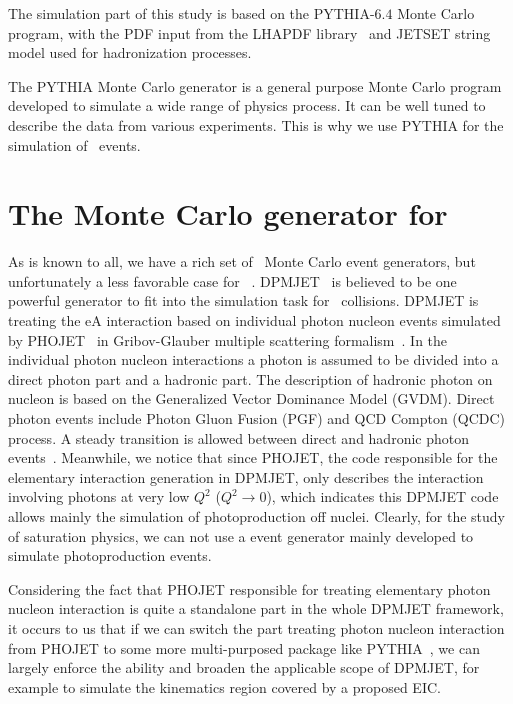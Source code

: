The simulation part of this study is based on the PYTHIA-$6.4$ Monte Carlo program,
with the PDF input from the LHAPDF library~\cite{Whalley:2005nh} and JETSET string model used for
hadronization processes. 


The PYTHIA Monte Carlo generator is a general purpose Monte Carlo program developed to simulate a wide range of physics process. It can be well tuned to describe the data from various experiments. This is why we use PYTHIA for the simulation of \ep\ events.


\section{The Monte Carlo generator for \eA\ }

As is known to all, we have a rich set of \ep\ Monte Carlo event generators, but
unfortunately a less favorable case for \eA~\cite{Boer:2011fh}.
DPMJET~\cite{Roesler:2000he} is believed to be one powerful generator to fit
into the simulation task for \eA\ collisions. DPMJET is treating the eA
interaction based on individual photon nucleon events simulated by
PHOJET~\cite{Engel:1994vs} in Gribov-Glauber multiple scattering
formalism~\cite{Engel:1996yb}. In the individual photon nucleon interactions a
photon is assumed to be divided into a direct photon part and a hadronic part. The
description of hadronic photon on nucleon is based on the Generalized Vector
Dominance Model (GVDM). Direct photon events include Photon Gluon Fusion (PGF)
and QCD Compton (QCDC) process. A steady transition is allowed between direct
and hadronic photon events~\cite{Roesler:1998wy}. Meanwhile, we notice that
since PHOJET, the code responsible for the elementary interaction generation in
DPMJET, only describes the interaction involving photons at very low $Q^2$ ($Q^{2}\rightarrow 0$), which indicates 
this DPMJET code allows mainly the simulation of
photoproduction off nuclei. Clearly, for the study of saturation physics, we can not use a event generator
mainly developed to simulate photoproduction events. 

Considering the fact that PHOJET responsible for treating elementary photon
nucleon interaction is quite a standalone part in the whole DPMJET framework, it
occurs to us that if we can switch the part treating photon nucleon interaction
from PHOJET to some more multi-purposed package like
PYTHIA~\cite{Sjostrand:2006za}, we can largely enforce the ability and broaden
the applicable scope of DPMJET, for example to simulate the kinematics region
covered by a proposed EIC.

